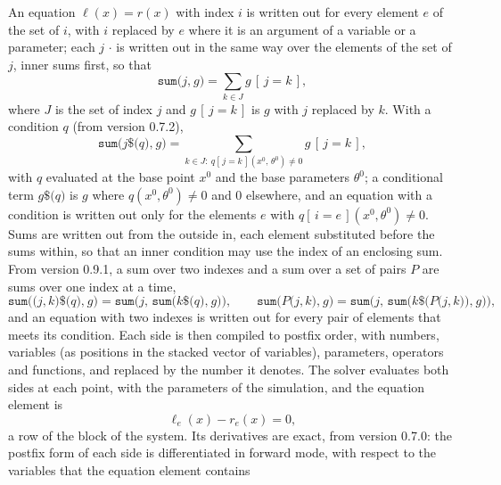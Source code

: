 An equation $\ell(x) = r(x)$ with index $i$ is written out for every element
$e$ of the set of $i$, with $i$ replaced by $e$ where it is an argument of a
variable or a parameter; each $j$\cmd{,} $\cdot$\cmd{)} is written
out in the same way over the elements of the set of $j$, inner sums first, so
that
\begin{equation*}
\texttt{sum(}j\texttt{,}\ g\texttt{)} = \sum_{k \in J} g\,[\,j = k\,],
\end{equation*}
where $J$ is the set of index $j$ and $g\,[\,j = k\,]$ is $g$ with $j$ replaced by
$k$. With a condition $q$ (from version 0.7.2),
\begin{equation*}
\texttt{sum(}j\texttt{\$(}q\texttt{),}\ g\texttt{)} = \sum_{k \in J:\ q[\,j = k\,](x^0,\,\theta^0) \neq 0} g\,[\,j = k\,],
\end{equation*}
with $q$ evaluated at the base point $x^0$ and the base parameters $\theta^0$;
a conditional term $g\texttt{\$(}q\texttt{)}$ is $g$ where $q(x^0, \theta^0) \neq 0$
and 0 elsewhere, and an equation with a condition is written out only for the
elements $e$ with $q[\,i = e\,](x^0, \theta^0) \neq 0$. Sums are written out from
the outside in, each element substituted before the sums within, so that an
inner condition may use the index of an enclosing sum. From version 0.9.1, a
sum over two indexes and a sum over a set of pairs $P$ are sums over one index
at a time,
\begin{equation*}
\texttt{sum((}j,k\texttt{)\$(}q\texttt{),}\ g\texttt{)} = \texttt{sum(}j\texttt{, sum(}k\texttt{\$(}q\texttt{),}\ g\texttt{))}, \qquad
\texttt{sum(}P\texttt{(}j,k\texttt{),}\ g\texttt{)} = \texttt{sum(}j\texttt{, sum(}k\texttt{\$(}P\texttt{(}j,k\texttt{)),}\ g\texttt{))},
\end{equation*}
and an equation with two indexes is written out for every pair of elements
that meets its condition.
Each side is then compiled to postfix order, with numbers, variables (as
positions in the stacked vector of variables), parameters, operators and
functions, and  replaced by the number it denotes. The solver
evaluates both sides at each point, with the parameters of the simulation, and
the equation element is
\begin{equation*}
\ell_e(x) - r_e(x) = 0,
\end{equation*}
a row of the block  of the system. Its derivatives are exact, from
version 0.7.0: the postfix form of each side is differentiated in forward
mode, with respect to the variables that the equation element contains
